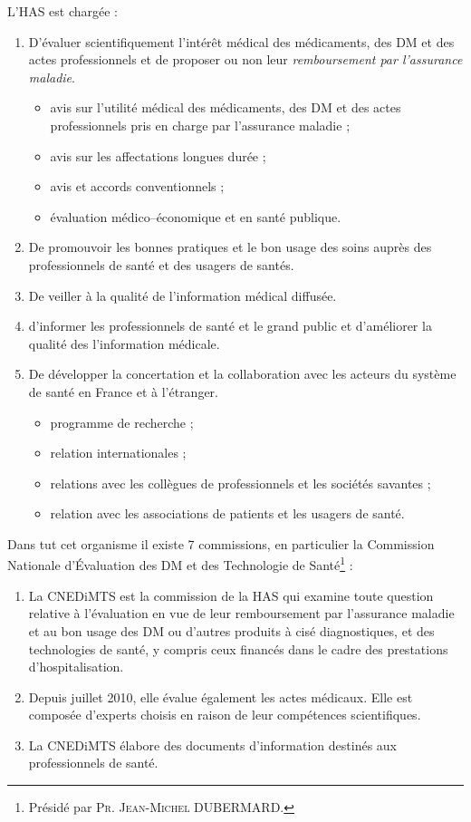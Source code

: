 \documentclass[a4paper,11pt]{article}
\begin{document}
\begin{sloppypar}
L'HAS est chargée :
\begin{enumerate}
 \item D'évaluer scientifiquement l'intérêt médical des médicaments, des DM et des actes professionnels et de proposer ou non
 leur \emph{remboursement par l'assurance maladie}.
 \begin{itemize}
  \item avis sur l'utilité médical des médicaments, des DM et des actes professionnels pris en charge par l'assurance maladie ;
  \item avis sur les affectations longues durée ;
  \item avis et accords conventionnels ;
  \item évaluation médico--économique et en santé publique.
 \end{itemize}
 \item De promouvoir les bonnes pratiques et le bon usage des soins auprès des professionnels de santé et des usagers de santés.
 \item De veiller à la qualité de l'information médical diffusée.
 \item d'informer les professionnels de santé et le grand public et d'améliorer la qualité des l'information médicale.
 \item De développer la concertation et la collaboration avec les acteurs du système de santé en France et à l'étranger.
 \begin{itemize}
  \item programme de recherche ;
  \item relation internationales ;
  \item relations avec les collègues de professionnels et les sociétés savantes ;
  \item relation avec les associations de patients et les usagers de santé.
 \end{itemize}

\end{enumerate}
\vspace{1.5ex}
Dans tut cet organisme il existe 7 commissions, en particulier la Commission Nationale d'\'Evaluation des DM et des Technologie de Santé\footnote{Présidé par \textsc{Pr. Jean-Michel DUBERMARD}.} :
\begin{enumerate}
 \item La CNEDiMTS est la commission de la HAS qui examine toute question relative à l'évaluation en vue de leur remboursement par l'assurance maladie et au bon usage 
 des DM ou d'autres produits à cisé diagnostiques, et des technologies de santé, y compris ceux financés dans le cadre des prestations d'hospitalisation.
 \item Depuis juillet 2010, elle évalue également les actes médicaux. Elle est composée d'experts choisis en raison de leur compétences scientifiques.
 \item La CNEDiMTS élabore des documents d'information destinés aux professionnels de santé.
\end{enumerate}


\end{sloppypar}
\end{document}
